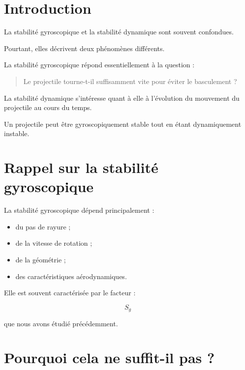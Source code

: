 
\section{Introduction}

La stabilité gyroscopique et la stabilité dynamique sont souvent confondues.

Pourtant, elles décrivent deux phénomènes différents.

La stabilité gyroscopique répond essentiellement à la question :

\begin{quote}
Le projectile tourne-t-il suffisamment vite pour éviter le basculement ?
\end{quote}

La stabilité dynamique s'intéresse quant à elle à l'évolution du mouvement
du projectile au cours du temps.

\begin{aretenir}

Un projectile peut être gyroscopiquement stable tout en étant
dynamiquement instable.

\end{aretenir}

\section{Rappel sur la stabilité gyroscopique}

La stabilité gyroscopique dépend principalement :

\begin{itemize}
    \item du pas de rayure ;
    \item de la vitesse de rotation ;
    \item de la géométrie ;
    \item des caractéristiques aérodynamiques.
\end{itemize}

Elle est souvent caractérisée par le facteur :

\begin{equation}
S_g
\end{equation}

que nous avons étudié précédemment.

\section{Pourquoi cela ne suffit-il pas ?}

